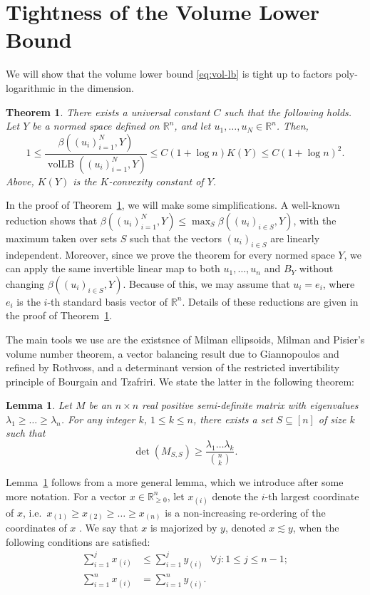\documentclass{article}
\newtheorem{theorem}{Theorem}
\newtheorem{lemma}{Lemma}
\newcommand{\R}{{\mathbb{R}}}
\DeclareMathOperator{\vollb}{volLB}
\begin{document}
\section{Tightness of the Volume Lower Bound}

We will show that the volume lower bound
\eqref{eq:vol-lb} is tight up to factors poly-logarithmic in the
dimension.

\begin{theorem}\label{thm:tightness}
  There exists a universal constant $C$ such that the following
  holds. Let $Y$ be a normed space defined on $\R^n$, and let $u_1,
  \ldots, u_N \in \R^n$.
  Then,
  \[
  1 \le \frac{\beta((u_i)_{i = 1}^N, Y)}{  \vollb((u_i)_{i = 1}^N, Y) } \le
  C(1+\log n)K(Y) \le C(1+\log n)^2.
  \]
  Above, $K(Y)$ is the $K$-convexity constant of $Y$.
\end{theorem}

In the proof of Theorem~\ref{thm:tightness}, we will make some
simplifications. A well-known reduction shows that $\beta((u_i)_{i =
  1}^N, Y) \le \max_{S}\beta((u_i)_{i \in  S}, Y)$, with the maximum taken
over sets $S$ such that the vectors $(u_i)_{i \in S}$ are linearly
independent. Moreover, since we prove the theorem for every normed
space $Y$, we can apply the same invertible linear map to both $u_1,
\ldots, u_n$ and $B_Y$ without changing $\beta((u_i)_{i \in  S},
Y)$. Because of this, we may assume that $u_i = e_i$, where $e_i$ is
the $i$-th standard basis vector of $\R^n$. Details of these
reductions are given in the proof of Theorem~\ref{thm:tightness}. 

The main tools we use are the existsnce of Milman ellipsoids, Milman
and Pisier's volume number theorem, a vector balancing result due to
Giannopoulos and refined by Rothvoss, and a determinant version of the
restricted invertibility principle of Bourgain and Tzafriri. We state
the latter in the following theorem:

\begin{lemma}\label{lm:rip-det}
  Let $M$ be an $n\times n$ real positive semi-definite matrix with
  eigenvalues $\lambda_1 \ge \ldots \ge \lambda_n$. For any integer
  $k$, $1 \le k \le n$, there exists a set $S \subseteq [n]$ of size $k$
  such that
  \[\det(M_{S,S}) \ge  \frac{\lambda_1 \ldots \lambda_k}{{n \choose k}}.\]
\end{lemma}

Lemma~\ref{lm:rip-det} follows from a more general lemma, which we
introduce after some more notation. For a vector $x \in
\R^n_{\ge 0}$, let $x_{(i)}$ denote the $i$-th largest coordinate of
$x$, i.e.~$x_{(1)} \ge x_{(2)} \ge \ldots \ge x_{(n)}$ is a
non-increasing re-ordering of the coordinates of $x$ . We say that
$x$ is majorized by $y$, denoted $x \lesssim y$, when the following
conditions are satisfied:
\begin{align*}
  \sum_{i = 1}^{j}x_{(i)} &\le   \sum_{i = 1}^{j}y_{(i)} \ \ \ \forall j:
  1 \le j \le n-1;\\
  \sum_{i = 1}^{n}x_{(i)} &=  \sum_{i = 1}^{n}y_{(i)}.
\end{align*}
\end{document}
